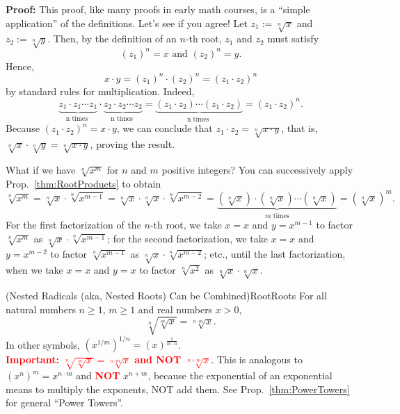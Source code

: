 \textbf{Proof:} This proof, like many proofs in early math courses, is a ``simple application'' of the definitions. Let's see if you agree! Let $z_1 :=  \sqrt[n]{x}$ and $ z_2 := \sqrt[n]{y}$. Then, by the definition of an $n$-th root, $z_1$ and $z_2$ must satisfy
    $$ (z_1)^n = x \text{ and } (z_2)^n = y.$$
    Hence, 
    $$ x \cdot y = (z_1)^n \cdot (z_2)^n = (z_1 \cdot z_2)^n $$
    by standard rules for multiplication. Indeed,
    $$ \underbrace{z_1 \cdot z_1 \cdots  z_1}_{\text{n times }} \cdot  \underbrace{z_2 \cdot z_2 \cdots  z_2}_{\text{n times }} =  \underbrace{(z_1 \cdot z_2) \cdots  (z_1 \cdot z_2)}_{\text{n times }}  = (z_1 \cdot z_2)^n.$$
   Because $(z_1 \cdot z_2 )^n = x\cdot y$, we can conclude that $z_1 \cdot z_2 = \sqrt[n]{x \cdot y}$, that is, $\sqrt[n]{x} \cdot \sqrt[n]{y} = \sqrt[n]{x \cdot y}$, proving the result.
\Qed

\begin{rem} What if we have $\sqrt[n]{x^m}$ for $n$ and $m$ positive integers? You can successively apply Prop.~\ref{thm:RootProducts} to obtain
$$\sqrt[n]{x^m} = \sqrt[n]{x} \cdot \sqrt[n]{x^{m-1}} =  \sqrt[n]{x} \cdot \sqrt[n]{x} \cdot \sqrt[n]{x^{m-2}} = \underbrace{\left(\sqrt[n]{x}\right) \cdot \left(\sqrt[n]{x}\right) \cdots\left(\sqrt[n]{x}\right) }_{m\text{ times}}= \left( \sqrt[n]{x}  \right)^m. $$
For the first factorization of the $n$-th root, we take $x=x$ and $y = x^{m-1}$ to factor $\sqrt[n]{x^m}$ as $\sqrt[n]{x} \cdot \sqrt[n]{x^{m-1}}$; for the second factorization, we take $x=x$ and $y = x^{m-2}$ to factor $\sqrt[n]{x^{m-1}}$ as $ \sqrt[n]{x} \cdot \sqrt[n]{x^{m-2}}$; etc., until the last factorization, when we take $x=x$ and $y = x$ to factor $\sqrt[n]{x^2}$ as $\sqrt[n]{x}  \cdot \sqrt[n]{x}$.
    \Qed
\end{rem}

\bigskip

\begin{propColor}{(Nested Radicals (aka, Nested Roots) Can be Combined)}{RootRoots} For all natural numbers $n\ge 1$, $m\ge 1$ and real numbers $x>0$,
     $$\sqrt[n]{ \sqrt[m]{x  }  } = \sqrt[n \cdot m]{  x} .$$
     In other symbols, $\left( x^{1/m}\right)^{1/n} = \left( x \right)^\frac{1}{m \cdot n}$.\\

     \textcolor{red}{\large \bf Important:  $\sqrt[n]{ \sqrt[m]{x}  } = \sqrt[n \cdot m]{x}$ and NOT $\sqrt[n+m]{ x}$}. This is analogous to $\left(x^n \right)^m = x^{n \cdot m}$ and \textcolor{red}{\large \bf NOT} $x^{n + m}$, because the exponential of an exponential means to multiply the exponents,  NOT  add them. See Prop.~\ref{thm:PowerTowers} for general ``Power Towers''.

\end{propColor}

